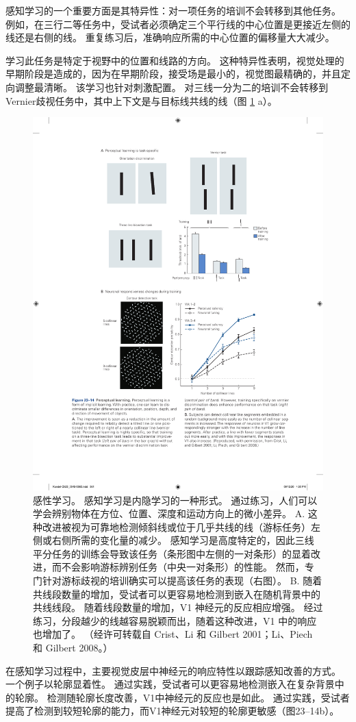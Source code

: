 感知学习的一个重要方面是其特异性：对一项任务的培训不会转移到其他任务。
例如，在三行二等任务中，受试者必须确定三个平行线的中心位置是更接近左侧的线还是右侧的线。
重复练习后，准确响应所需的中心位置的偏移量大大减少。


学习此任务是特定于视野中的位置和线路的方向。
这种特异性表明，视觉处理的早期阶段是造成的，因为在早期阶段，接受场是最小的，视觉图最精确的，并且定向调整最清晰。
该学习也针对刺激配置。
对三线一分为二的培训不会转移到Vernier歧视任务中，其中上下文是与目标线共线的线（图 \ref{fig:23_14} a）。

\begin{figure}[htbp]
	\centering
	\includegraphics[width=0.65\linewidth]{chap23/fig_23_14}
	\caption{感性学习。 感知学习是内隐学习的一种形式。 通过练习，人们可以学会辨别物体在方位、位置、深度和运动方向上的微小差异。 A. 这种改进被视为可靠地检测倾斜线或位于几乎共线的线（游标任务）左侧或右侧所需的变化量的减少。 感知学习是高度特定的，因此三线平分任务的训练会导致该任务（条形图中左侧的一对条形）的显着改进，而不会影响游标辨别任务（中央一对条形）的性能。 然而，专门针对游标歧视的培训确实可以提高该任务的表现（右图）。 B. 随着共线段数量的增加，受试者可以更容易地检测到嵌入在随机背景中的共线线段。 随着线段数量的增加，V1 神经元的反应相应增强。 经过练习，分段越少的线越容易脱颖而出，随着这种改进，V1 中的响应也增加了。 （经许可转载自 Crist、Li 和 Gilbert 2001；Li、Piech 和 Gilbert 2008。）}
	\label{fig:23_14}
\end{figure}


在感知学习过程中，主要视觉皮层中神经元的响应特性以跟踪感知改善的方式。
一个例子以轮廓显着性。
通过实践，受试者可以更容易地检测嵌入在复杂背景中的轮廓。
检测随轮廓长度改善，V1中神经元的反应也是如此。
通过实践，受试者提高了检测到较短轮廓的能力，而V1神经元对较短的轮廓更敏感（图23–14b）。



